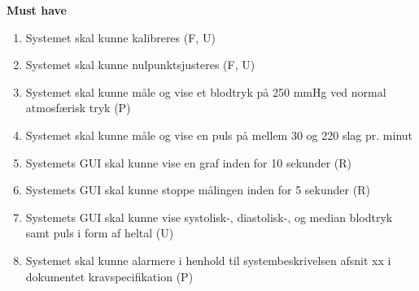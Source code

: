 \vspace{0.5 cm}
\textbf{Must have}
\begin{enumerate}
	\item Systemet skal kunne kalibreres (F, U)
	\item Systemet skal kunne nulpunktsjusteres (F, U)
	\item Systemet skal kunne måle og vise et blodtryk på 250 mmHg ved normal atmosfærisk tryk (P)
	\item Systemet skal kunne måle og vise en puls på mellem 30 og 220 slag pr. minut
	\item Systemets GUI skal kunne vise en graf inden for 10 sekunder (R)
	\item Systemets GUI skal kunne stoppe målingen inden for 5 sekunder (R)
	\item Systemets GUI skal kunne vise systolisk-, diastolisk-, og median blodtryk samt puls i form af heltal (U)
	\item Systemet skal kunne alarmere i henhold til systembeskrivelsen afsnit xx i dokumentet kravspecifikation (P)
\end{enumerate}

 
\clearpage